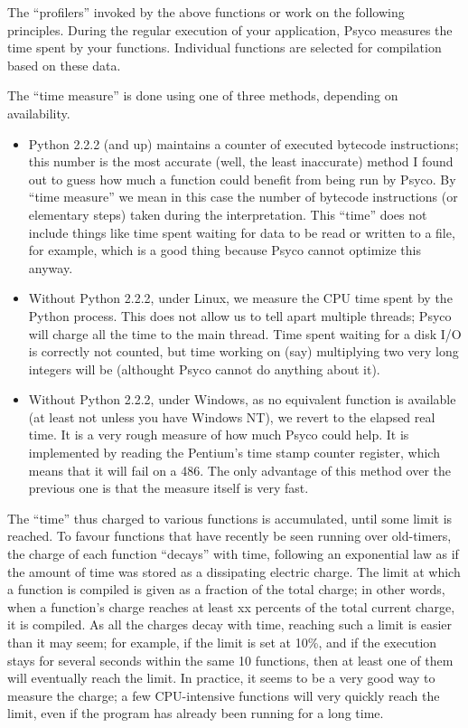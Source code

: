 \documentclass{manual}
\begin{document}
The ``profilers'' invoked by the above functions  or  work on the following principles.  During the regular execution of your application, Psyco measures the time spent by your functions.  Individual functions are selected for compilation based on these data.

The ``time measure'' is done using one of three methods, depending on availability.

\begin{itemize}
  
\item Python 2.2.2 (and up) maintains a counter of executed bytecode instructions; this number is the most accurate (well, the least inaccurate) method I found out to guess how much a function could benefit from being run by Psyco.  By ``time measure'' we mean in this case the number of bytecode instructions (or elementary steps) taken during the interpretation.  This ``time'' does not include things like time spent waiting for data to be read or written to a file, for example, which is a good thing because Psyco cannot optimize this anyway.

\item Without Python 2.2.2, under Linux, we measure the CPU time spent by the Python process.  This does not allow us to tell apart multiple threads; Psyco will charge all the time to the main thread.  Time spent waiting for a disk I/O is correctly not counted, but time working on (say) multiplying two very long integers will be (althought Psyco cannot do anything about it).
  
\item Without Python 2.2.2, under Windows, as no equivalent function is available (at least not unless you have Windows NT), we revert to the elapsed real time.  It is a very rough measure of how much Psyco could help.  It is implemented by reading the Pentium's time stamp counter register, which means that it will fail on a 486.  The only advantage of this method over the previous one is that the measure itself is very fast.

\end{itemize}

The ``time'' thus charged to various functions is accumulated, until some limit is reached.  To favour functions that have recently be seen running over old-timers, the charge of each function ``decays'' with time, following an exponential law as if the amount of time was stored as a dissipating electric charge.  The limit at which a function is compiled is given as a fraction of the total charge; in other words, when a function's charge reaches at least xx percents of the total current charge, it is compiled.  As all the charges decay with time, reaching such a limit is easier than it may seem; for example, if the limit is set at 10\%, and if the execution stays for several seconds within the same 10 functions, then at least one of them will eventually reach the limit.  In practice, it seems to be a very good way to measure the charge; a few CPU-intensive functions will very quickly reach the limit, even if the program has already been running for a long time.
\end{document}
